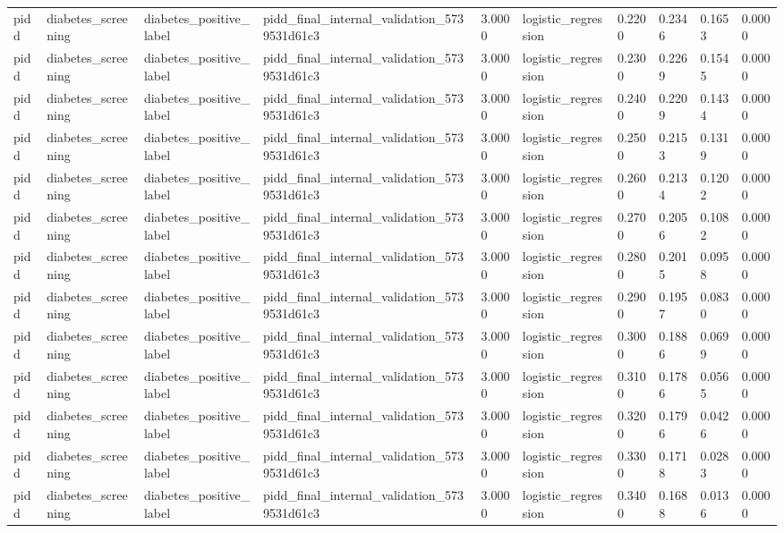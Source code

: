 \begin{tabular}{llllllllll}
pidd & diabetes\_screening & diabetes\_positive\_label & pidd\_final\_internal\_validation\_5739531d61c3 & 3.0000 & logistic\_regression & 0.2200 & 0.2346 & 0.1653 & 0.0000 \\
pidd & diabetes\_screening & diabetes\_positive\_label & pidd\_final\_internal\_validation\_5739531d61c3 & 3.0000 & logistic\_regression & 0.2300 & 0.2269 & 0.1545 & 0.0000 \\
pidd & diabetes\_screening & diabetes\_positive\_label & pidd\_final\_internal\_validation\_5739531d61c3 & 3.0000 & logistic\_regression & 0.2400 & 0.2209 & 0.1434 & 0.0000 \\
pidd & diabetes\_screening & diabetes\_positive\_label & pidd\_final\_internal\_validation\_5739531d61c3 & 3.0000 & logistic\_regression & 0.2500 & 0.2153 & 0.1319 & 0.0000 \\
pidd & diabetes\_screening & diabetes\_positive\_label & pidd\_final\_internal\_validation\_5739531d61c3 & 3.0000 & logistic\_regression & 0.2600 & 0.2134 & 0.1202 & 0.0000 \\
pidd & diabetes\_screening & diabetes\_positive\_label & pidd\_final\_internal\_validation\_5739531d61c3 & 3.0000 & logistic\_regression & 0.2700 & 0.2056 & 0.1082 & 0.0000 \\
pidd & diabetes\_screening & diabetes\_positive\_label & pidd\_final\_internal\_validation\_5739531d61c3 & 3.0000 & logistic\_regression & 0.2800 & 0.2015 & 0.0958 & 0.0000 \\
pidd & diabetes\_screening & diabetes\_positive\_label & pidd\_final\_internal\_validation\_5739531d61c3 & 3.0000 & logistic\_regression & 0.2900 & 0.1957 & 0.0830 & 0.0000 \\
pidd & diabetes\_screening & diabetes\_positive\_label & pidd\_final\_internal\_validation\_5739531d61c3 & 3.0000 & logistic\_regression & 0.3000 & 0.1886 & 0.0699 & 0.0000 \\
pidd & diabetes\_screening & diabetes\_positive\_label & pidd\_final\_internal\_validation\_5739531d61c3 & 3.0000 & logistic\_regression & 0.3100 & 0.1786 & 0.0565 & 0.0000 \\
pidd & diabetes\_screening & diabetes\_positive\_label & pidd\_final\_internal\_validation\_5739531d61c3 & 3.0000 & logistic\_regression & 0.3200 & 0.1796 & 0.0426 & 0.0000 \\
pidd & diabetes\_screening & diabetes\_positive\_label & pidd\_final\_internal\_validation\_5739531d61c3 & 3.0000 & logistic\_regression & 0.3300 & 0.1718 & 0.0283 & 0.0000 \\
pidd & diabetes\_screening & diabetes\_positive\_label & pidd\_final\_internal\_validation\_5739531d61c3 & 3.0000 & logistic\_regression & 0.3400 & 0.1688 & 0.0136 & 0.0000 \\

\end{tabular}
